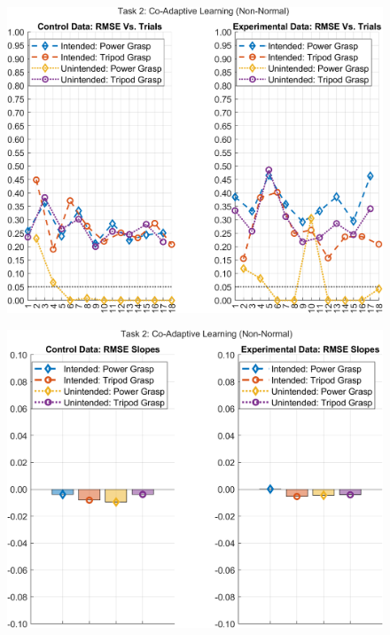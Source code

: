 \documentclass[12pt]{article}
\newcommand\figWidth{7in}
\begin{document}
\newpage
\clearpage
\begin{figure}
    \includegraphics[width = \figWidth]{t2-rmse-xnorm.png}
\end{figure}
\begin{figure}
    \includegraphics[width = \figWidth]{t2-bar-xnorm.png}
\end{figure}
\end{document}
